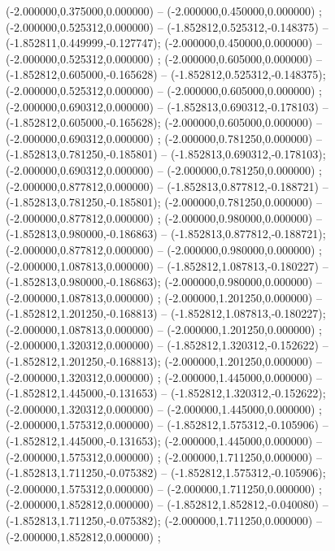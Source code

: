  (-2.000000,0.375000,0.000000) -- (-2.000000,0.450000,0.000000) ;
 (-2.000000,0.525312,0.000000) -- (-1.852812,0.525312,-0.148375) -- (-1.852811,0.449999,-0.127747);
 (-2.000000,0.450000,0.000000) -- (-2.000000,0.525312,0.000000) ;
 (-2.000000,0.605000,0.000000) -- (-1.852812,0.605000,-0.165628) -- (-1.852812,0.525312,-0.148375);
 (-2.000000,0.525312,0.000000) -- (-2.000000,0.605000,0.000000) ;
 (-2.000000,0.690312,0.000000) -- (-1.852813,0.690312,-0.178103) -- (-1.852812,0.605000,-0.165628);
 (-2.000000,0.605000,0.000000) -- (-2.000000,0.690312,0.000000) ;
 (-2.000000,0.781250,0.000000) -- (-1.852813,0.781250,-0.185801) -- (-1.852813,0.690312,-0.178103);
 (-2.000000,0.690312,0.000000) -- (-2.000000,0.781250,0.000000) ;
 (-2.000000,0.877812,0.000000) -- (-1.852813,0.877812,-0.188721) -- (-1.852813,0.781250,-0.185801);
 (-2.000000,0.781250,0.000000) -- (-2.000000,0.877812,0.000000) ;
 (-2.000000,0.980000,0.000000) -- (-1.852813,0.980000,-0.186863) -- (-1.852813,0.877812,-0.188721);
 (-2.000000,0.877812,0.000000) -- (-2.000000,0.980000,0.000000) ;
 (-2.000000,1.087813,0.000000) -- (-1.852812,1.087813,-0.180227) -- (-1.852813,0.980000,-0.186863);
 (-2.000000,0.980000,0.000000) -- (-2.000000,1.087813,0.000000) ;
 (-2.000000,1.201250,0.000000) -- (-1.852812,1.201250,-0.168813) -- (-1.852812,1.087813,-0.180227);
 (-2.000000,1.087813,0.000000) -- (-2.000000,1.201250,0.000000) ;
 (-2.000000,1.320312,0.000000) -- (-1.852812,1.320312,-0.152622) -- (-1.852812,1.201250,-0.168813);
 (-2.000000,1.201250,0.000000) -- (-2.000000,1.320312,0.000000) ;
 (-2.000000,1.445000,0.000000) -- (-1.852812,1.445000,-0.131653) -- (-1.852812,1.320312,-0.152622);
 (-2.000000,1.320312,0.000000) -- (-2.000000,1.445000,0.000000) ;
 (-2.000000,1.575312,0.000000) -- (-1.852812,1.575312,-0.105906) -- (-1.852812,1.445000,-0.131653);
 (-2.000000,1.445000,0.000000) -- (-2.000000,1.575312,0.000000) ;
 (-2.000000,1.711250,0.000000) -- (-1.852813,1.711250,-0.075382) -- (-1.852812,1.575312,-0.105906);
 (-2.000000,1.575312,0.000000) -- (-2.000000,1.711250,0.000000) ;
 (-2.000000,1.852812,0.000000) -- (-1.852812,1.852812,-0.040080) -- (-1.852813,1.711250,-0.075382);
 (-2.000000,1.711250,0.000000) -- (-2.000000,1.852812,0.000000) ;
